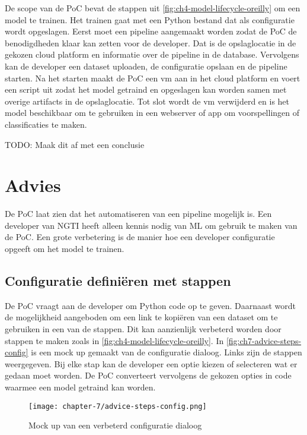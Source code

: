 De scope van de PoC bevat de stappen uit \autoref{fig:ch4-model-lifecycle-oreilly} om een model te trainen. Het trainen gaat met een Python bestand dat als configuratie wordt opgeslagen. Eerst moet een pipeline aangemaakt worden zodat de PoC de benodigdheden klaar kan zetten voor de developer. Dat is de opslaglocatie in de gekozen cloud platform en informatie over de pipeline in de database. Vervolgens kan de developer een dataset uploaden, de configuratie opslaan en de pipeline starten. Na het starten maakt de PoC een \acrshort{vm} aan in het cloud platform en voert een script uit zodat het model getraind en opgeslagen kan worden samen met overige \glspl{artifact} in de opslaglocatie. Tot slot wordt de \acrshort{vm} verwijderd en is het model beschikbaar om te gebruiken in een webserver of app om voorspellingen of classificaties te maken.

TODO: Maak dit af met een conclusie

\section{Advies}\label{sec:ch7-advies}
De PoC laat zien dat het automatiseren van een pipeline mogelijk is. Een developer van NGTI heeft alleen kennis nodig van ML om gebruik te maken van de PoC. Een grote verbetering is de manier hoe een developer configuratie opgeeft om het model te trainen.


\subsection{Configuratie definiëren met stappen}\label{subsec:ch7-configuratie-definieren-met-stappen}
De PoC vraagt aan de developer om Python code op te geven. Daarnaast wordt de mogelijkheid aangeboden om een link te kopiëren van een dataset om te gebruiken in een van de stappen. Dit kan aanzienlijk verbeterd worden door stappen te maken zoals in \autoref{fig:ch4-model-lifecycle-oreilly}. In \autoref{fig:ch7-advice-steps-config} is een mock up gemaakt van de configuratie dialoog. Links zijn de stappen weergegeven. Bij elke stap kan de developer een optie kiezen of selecteren wat er gedaan moet worden. De PoC converteert vervolgens de gekozen opties in code waarmee een model getraind kan worden.

\newpage

\begin{figure}[hbt!]
  \centering
  \texttt{[image: chapter-7/advice-steps-config.png]}
  \caption{Mock up van een verbeterd configuratie dialoog}
  \label{fig:ch7-advice-steps-config}
\end{figure}

